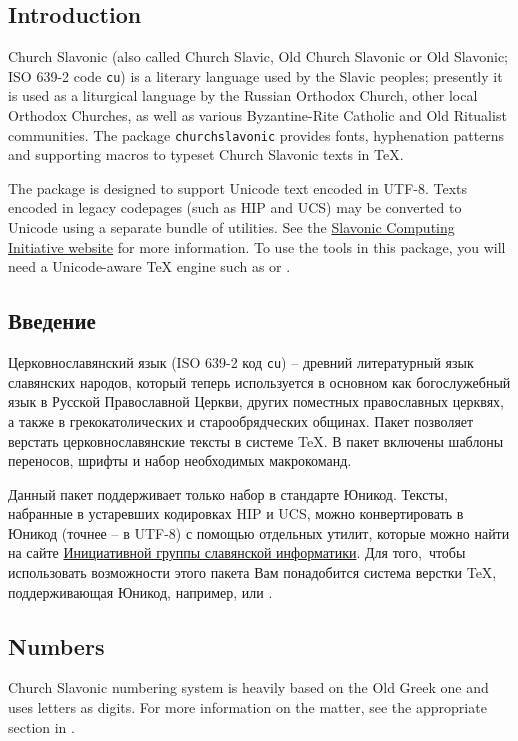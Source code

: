 \begin{EN}
\section*{Introduction}
Church Slavonic (also called Church Slavic, Old Church Slavonic
or Old Slavonic; ISO 639-2 code \texttt{cu}) is a literary language used by
the Slavic peoples; presently it is used as a liturgical language by the
Russian Orthodox Church, other local Orthodox Churches, as well
as various Byzantine-Rite Catholic and Old Ritualist communities.
The package \texttt{churchslavonic} provides fonts, hyphenation
patterns and supporting macros to typeset
Church Slavonic texts in \TeX{}.

The package is designed to support Unicode text encoded in UTF-8.
Texts encoded in legacy codepages (such as HIP and UCS) may be
converted to Unicode using a separate bundle of utilities.
See the \href{http://sci.ponomar.net/}
{Slavonic Computing Initiative website} for more information.
To use the tools in this package, you will need a Unicode-aware \TeX{}
engine such as \XeTeX{} or \LuaTeX{}.
\end{EN}

\begin{RU}
\section*{Введение}
Церковнославянский язык (ISO 639-2 код \texttt{cu}) --
древний литературный язык славянских народов,
который теперь используется в основном как богослужебный язык
в Русской Православной Церкви, других поместных православных
церквях, а также в грекокатолических и старообрядческих общинах.
Пакет  позволяет верстать церковнославянские тексты
в системе \TeX{}. В пакет включены шаблоны переносов,
шрифты и набор необходимых макрокоманд.

Данный пакет поддерживает только набор в стандарте Юникод.
Тексты, набранные в устаревших кодировках HIP и UCS,
можно конвертировать в Юникод (точнее -- в UTF-8) с помощью
отдельных утилит, которые можно найти на сайте
\href{http://sci.ponomar.net/}
{Инициативной группы славянской информатики}.
Для того, чтобы использовать возможности этого пакета Вам
понадобится система верстки \TeX{}, поддерживающая Юникод,
например, \XeTeX{} или \LuaTeX{}.
\end{RU}

\begin{EN}
\section{Numbers}

Church Slavonic numbering system is heavily based on the Old Greek one and uses 
letters as digits.
For more information on the matter, see the appropriate section in \cite{UN41}.
\end{EN}

